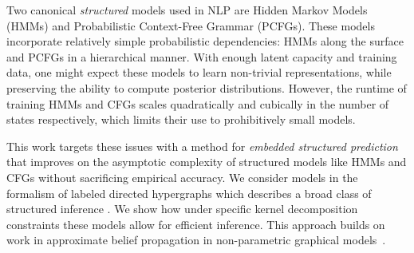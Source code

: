 \documentclass{article}
\newcommand\todo[1]{\textcolor{red}{#1}}
\begin{document}
Two canonical \textit{structured} models used in NLP are Hidden Markov
Models (HMMs) and Probabilistic Context-Free Grammar (PCFGs). These models
incorporate relatively simple probabilistic dependencies: HMMs along
the surface and PCFGs in a hierarchical manner.  With enough latent
capacity and training data, one might expect these models to learn non-trivial
representations, while preserving the ability to compute posterior
distributions. However, the runtime of training HMMs and CFGs scales 
quadratically and cubically in the number of states respectively, which limits their use to prohibitively small models.









This work targets these issues with a method for \textit{embedded structured prediction} that improves on the asymptotic complexity of structured models like HMMs and CFGs
without sacrificing empirical accuracy. We consider models in the
formalism of labeled directed hypergraphs which describes a broad class
of structured inference \citep{klein2004parsing,huang2005better,zhou2006learning,javidian2020hypergraph,chiang2020factor}. We show how under specific kernel
decomposition constraints these models allow for efficient inference. This approach builds on work in approximate belief propagation in non-parametric graphical models~\citep{song2011kernelbp}.
\end{document}
